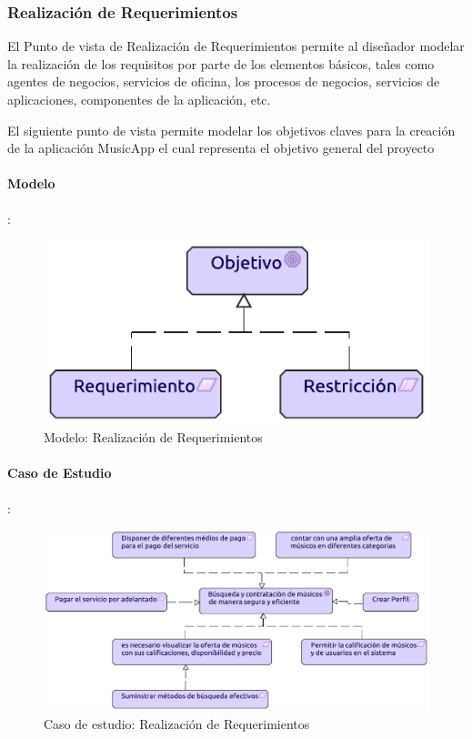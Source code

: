 \newpage

\subsubsection{Realización de Requerimientos}
El Punto de vista de Realización de Requerimientos permite al diseñador modelar la realización de los requisitos por parte de los elementos básicos, tales como agentes de negocios, servicios de oficina, los procesos de negocios, servicios de aplicaciones, componentes de la aplicación, etc.  \vspace{\baselineskip}

El siguiente punto de vista permite modelar los objetivos claves para la creación de la aplicación MusicApp el cual representa el objetivo general del proyecto

\paragraph{Modelo}:
\begin{figure}[h!]
	\centering
	\includegraphics[width=0.8\linewidth]{Desarrollo/ArquitecturaEmpresarial/Motivacion/imgs/RealizacionMetamodelo.pdf}
	\caption{Modelo: Realización de Requerimientos}
\end{figure}
\newpage
\paragraph{Caso de Estudio}:
\begin{figure}[h!]
	\centering
	\includegraphics[width=\linewidth]{Desarrollo/ArquitecturaEmpresarial/Motivacion/imgs/Realizacion.pdf}
	\caption{Caso de estudio: Realización de Requerimientos}
	\label{fig:comportamiento}
\end{figure}

